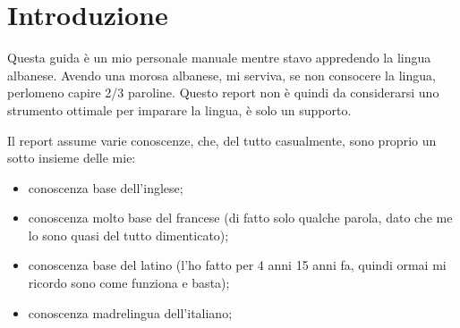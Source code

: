 \chapter{Introduzione}

Questa guida è un mio personale manuale mentre stavo appredendo la lingua albanese. Avendo una morosa albanese, mi serviva, se non consocere la lingua, perlomeno capire 2/3 paroline. Questo report non è quindi da considerarsi uno strumento ottimale per imparare la lingua, è solo un supporto.

Il report assume varie conoscenze, che, del tutto casualmente, sono proprio un sotto insieme delle mie:

\begin{itemize}
    \item conoscenza base dell'inglese;
    \item conoscenza molto base del francese (di fatto solo qualche parola, dato che me lo sono quasi del tutto dimenticato);
    \item conoscenza base del latino (l'ho fatto per 4 anni 15 anni fa, quindi ormai mi ricordo sono come funziona e basta);
    \item conoscenza madrelingua dell'italiano;
\end{itemize}
